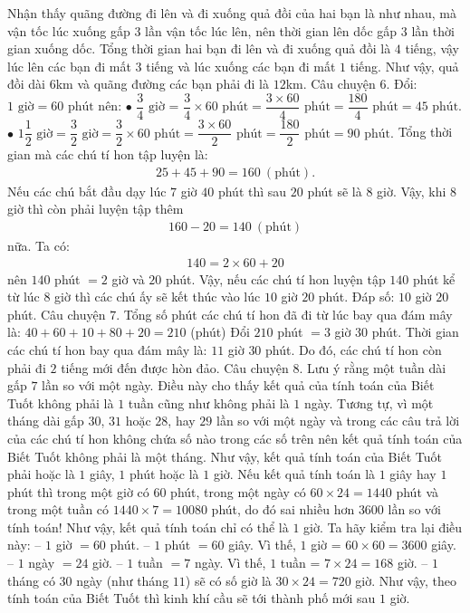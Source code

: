 Nhận thấy quãng đường đi lên và đi xuống quả đồi của hai bạn là như nhau, mà vận tốc lúc xuống gấp $3$ lần vận tốc lúc lên, nên thời gian lên dốc gấp $3$ lần thời
gian xuống dốc. Tổng thời gian hai bạn đi lên và đi xuống quả đồi là $4$ tiếng, vậy lúc lên các bạn đi mất $3$ tiếng và lúc xuống các bạn đi mất $1$ tiếng.
Như vậy, quả đồi dài 6km và quãng đường các bạn phải đi là $12$km.
\vskip 0.1cm
Câu chuyện $6$.
\vskip 0.1cm
Đổi: $1 \mbox{ giờ} = 60 \mbox{ phút}$ nên: 
\vskip 0.1cm
$\bullet$ $\dfrac{3}{4} \mbox{ giờ}$ = $\dfrac{3}{4}\times 60 \mbox{ phút}= \dfrac{3\times 60}{4}  \mbox{ phút}= \dfrac{180}{4}  \mbox{ phút}= 45 \mbox{ phút}.$ 
\vskip 0.1cm
$\bullet$ $1\dfrac{1}{2} \mbox{ giờ}= \dfrac{3}{2} \mbox{ giờ} = \dfrac{3}{2}\times 60  \mbox{ phút}= \dfrac{3\times 60}{2}  \mbox{ phút}= \dfrac{180}{2}  \mbox{ phút}= 90 \mbox{ phút}.$
\vskip 0.1cm
Tổng thời gian mà các chú tí hon tập luyện là:
\begin{align*}
	25 + 45 + 90= 160 \ (\textrm{phút}).
\end{align*}
Nếu các chú bắt đầu dạy lúc $7$ giờ $40$ phút thì sau $20$ phút sẽ là $8$ giờ. Vậy, khi $8$ giờ thì còn phải luyện tập thêm
\begin{align*}
	160-20=140\ (\textrm{phút})
\end{align*}
nữa. Ta có:
\begin{align*}
	140= 2\times 60 +20
\end{align*}
nên $140$ phút $=2$ giờ và $20$ phút. Vậy, nếu các chú tí hon luyện tập $140$ phút kể từ lúc $8$ giờ thì các chú ấy sẽ kết thúc vào lúc  $10$ giờ $20$ phút.
\vskip 0.1cm
Đáp số: $10$ giờ $20$ phút.
\vskip 0.1cm
Câu chuyện $7.$
\vskip 0.1cm
Tổng số phút các chú tí hon đã đi từ lúc bay qua đám mây là:
\vskip 0.1cm
$40 + 60 + 10 + 80 + 20 = 210$ (phút)
\vskip 0.1cm
Đổi $210$ phút  $= 3$ giờ $30$ phút.
\vskip 0.1cm
Thời gian các chú tí hon bay qua đám mây là: $11$ giờ $30$ phút. Do đó, các chú tí hon còn phải đi $2$ tiếng mới đến được hòn đảo.
\vskip 0.1cm
Câu chuyện $8.$ 
\vskip 0.1cm
Lưu ý rằng một tuần dài gấp $7$ lần so với một ngày. Điều này cho thấy kết quả của tính toán của Biết Tuốt không phải là $1$ tuần cũng như không phải là $1$ ngày. Tương tự, vì một tháng dài gấp $30$, $31$ hoặc $28$, hay $29$ lần so với một ngày và trong các câu trả lời của các chú tí hon không chứa số nào trong các số trên nên kết quả tính toán của Biết Tuốt không phải là một tháng. Như vậy, kết quả tính toán của Biết Tuốt phải hoặc là $1$ giây, $1$ phút hoặc là $1$ giờ. Nếu kết quả tính toán là $1$ giây hay $1$ phút thì trong một giờ có $60$ phút, trong một ngày có $60 \times 24 = 1440$ phút và trong một tuần có $1440\times 7 = 10080$ phút, do đó sai nhiều hơn $3600$ lần so với tính toán! Như vậy, kết quả tính toán chỉ có thể là $1$ giờ. Ta hãy kiểm tra lại điều này: -- $1$ giờ $= 60$ phút. -- $1$ phút $= 60$ giây. Vì thế, $1$ giờ = $60\times 60 = 3600$ giây. -- $1$ ngày $= 24$ giờ. -- $1$ tuần $= 7$ ngày. Vì thế, $1$ tuần = $7\times 24 = 168$ giờ. -- $1$ tháng có $30$ ngày (như tháng $11$) sẽ có số giờ là $30\times 24 = 720$ giờ. Như vậy, theo tính toán của Biết Tuốt thì kinh khí cầu sẽ tới thành phố mới sau $1$ giờ.
